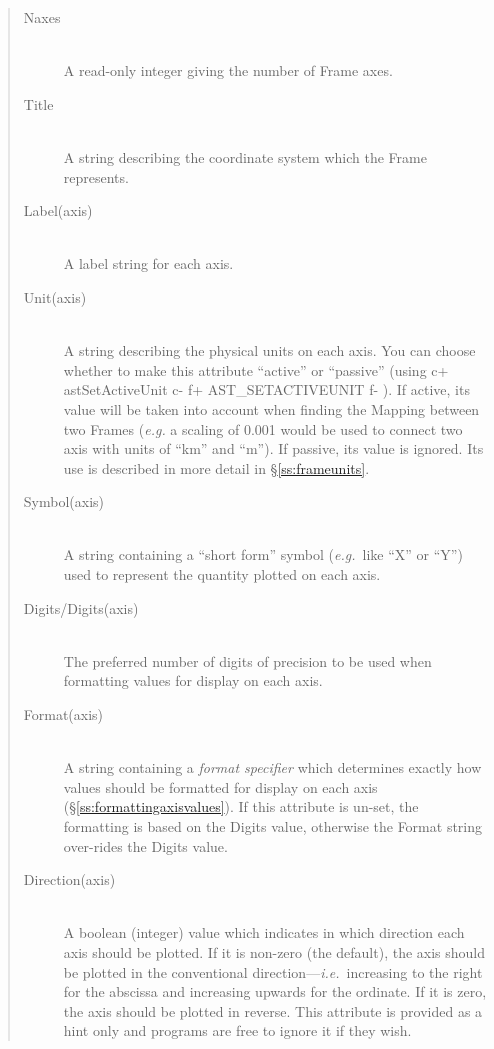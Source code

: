 \documentclass[twoside,11pt]{article}
\newcommand{\secref}[1]{\S\ref{#1}}
\newcommand{\secref}[1]{\ref{#1}}
\begin{document}
\begin{quote}
\begin{description}
\item[Naxes]\mbox{}\\
A read-only integer giving the number of Frame axes.

\item[Title]\mbox{}\\
A string describing the coordinate system which the Frame represents.

\item[Label(axis)]\mbox{}\\
A label string for each axis.

\item[Unit(axis)]\mbox{}\\
A string describing the physical units on each axis. You can choose
whether to make this attribute ``active'' or ``passive'' (using
c+
astSetActiveUnit
c-
f+
AST\_SETACTIVEUNIT
f-
). If active, its value will be taken into account when finding the
Mapping between two Frames (\emph{e.g.} a scaling of 0.001 would be used
to connect two axis with units of ``km'' and ``m''). If passive, its value
is ignored. Its use is described in more detail in \secref{ss:frameunits}.

\item[Symbol(axis)]\mbox{}\\
A string containing a ``short form'' symbol ({\em{e.g.}}\ like ``X''
or ``Y'') used to represent the quantity plotted on each axis.

\item[Digits/Digits(axis)]\mbox{}\\
The preferred number of digits of precision to be used when formatting
values for display on each axis.

\item[Format(axis)]\mbox{}\\
A string containing a {\em{format specifier}} which determines exactly
how values should be formatted for display on each axis
(\secref{ss:formattingaxisvalues}). If this attribute is un-set, the
formatting is based on the Digits value, otherwise the Format string
over-rides the Digits value.

\item[Direction(axis)]\mbox{}\\
A boolean (integer) value which indicates in which direction each axis
should be plotted. If it is non-zero (the default), the axis should be
plotted in the conventional direction---{\em{i.e.}}\ increasing to the
right for the abscissa and increasing upwards for the ordinate. If it
is zero, the axis should be plotted in reverse.  This attribute is
provided as a hint only and programs are free to ignore it if they
wish.


\end{description}
\end{quote}
\end{document}
